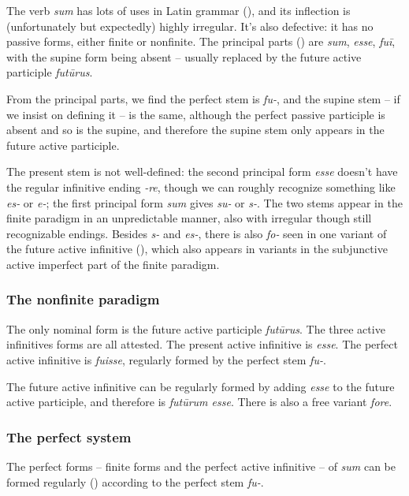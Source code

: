 \documentclass[a4paper, oneside, 12pt]{report}
\newcommand{\form}[1]{\emph{#1}}
\begin{document}
The verb \form{sum} has lots of uses in Latin grammar (),
and its inflection is (unfortunately but expectedly) highly irregular.
It's also defective: 
it has no passive forms, either finite or nonfinite.
The principal parts () are 
\form{sum}, \form{esse}, \form{fuī}, 
with the supine form being absent -- usually replaced by the future active participle \form{futūrus}.

From the principal parts, 
we find the perfect stem is \form{fu-}, 
and the supine stem -- if we insist on defining it -- 
is the same, 
although the perfect passive participle is absent and so is the supine,
and therefore the supine stem only appears in the future active participle.

The present stem is not well-defined:
the second principal form \form{esse}
doesn't have the regular infinitive ending \form{-re},
though we can roughly recognize something like \form{es-} or \form{e-};
the first principal form \form{sum} gives \form{su-} or \form{s-}.
The two stems appear in the finite paradigm in an unpredictable manner, 
also with irregular though still recognizable endings.
Besides \form{s-} and \form{es-},
there is also \form{fo-} seen in one variant of the future active infinitive
(),
which also appears in variants in
the subjunctive active imperfect part of the finite paradigm.

\subsubsection{The nonfinite paradigm}\label{sec:verb-inflection.irregular.sum.nonfinite}

The only nominal form is the future active participle \form{futūrus}.
The three active infinitives forms are all attested.
The present active infinitive is \form{esse}.
The perfect active infinitive is \form{fuisse}, 
regularly formed by the perfect stem \form{fu-}.

The future active infinitive can be regularly formed by adding \form{esse} 
to the future active participle,
and therefore is \form{futūrum esse}.
There is also a free variant \form{fore}.

\subsubsection{The perfect system}

The perfect forms -- finite forms and the perfect active infinitive -- 
of \form{sum} can be formed regularly ()
according to the perfect stem \form{fu-}.
\end{document}
